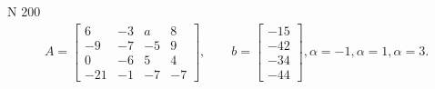\documentclass[11pt]{report}
\begin{document}
N 200
\begin{align*}
 A = \left[\begin{matrix}6 & -3 & a & 8\\-9 & -7 & -5 & 9\\0 & -6 & 5 & 4\\-21 & -1 & -7 & -7\end{matrix}\right],
    \qquad b = \left[\begin{matrix}-15\\-42\\-34\\-44\end{matrix}\right], \alpha = -1, \alpha = 1, \alpha = 3. 
 \end{align*}
\end{document}

